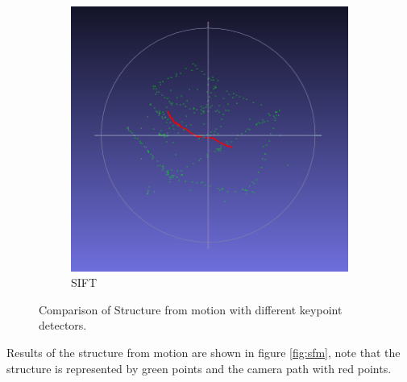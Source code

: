 \begin{figure}[H]
	\begin{subfigure}{0.5\textwidth}
        \centering
        \includegraphics[width=0.9\linewidth]{figs/SFM1-sift.png}
        \caption{SIFT}
      \end{subfigure}
       \caption{Comparison of Structure from motion with different keypoint detectors.}
	\label{fig:comparison-keypoints-sfm}
\end{figure}

Results of the structure from motion are shown in figure \ref{fig:sfm}, note that the structure is represented by green points and the camera path with red points.

